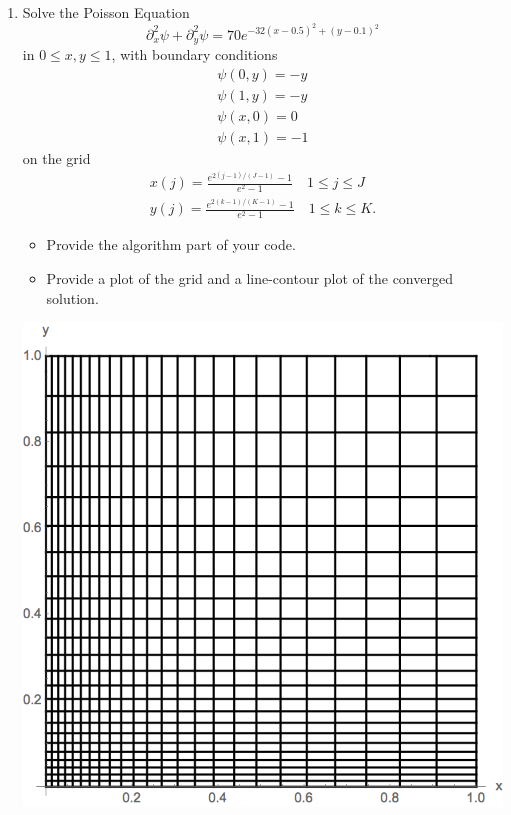 \documentclass[11pt, oneside]{article}
\begin{document}
\begin{enumerate}
  \item %
    Solve the Poisson Equation
    \[
      \partial_x^2\psi + \partial^2_y\psi = 70e^{-32(x - 0.5)^2 + (y - 0.1)^2}
    \]
    in $0 \le x, y \le 1$, with boundary conditions
    \begin{gather*}
      \psi(0, y) = -y \\
      \psi(1, y) = -y \\
      \psi(x, 0) = 0 \\
      \psi(x, 1) = -1
    \end{gather*}
    on the grid
    \begin{gather*}
      x(j) = \frac{e^{2(j-1)/(J-1)} - 1}{e^2 - 1} \quad 1 \le j \le J \\
      y(j) = \frac{e^{2(k-1)/(K-1)} - 1}{e^2 - 1} \quad 1 \le k \le K.
    \end{gather*}
    \begin{itemize}
      \item Provide the algorithm part of your code.
      \item Provide a plot of the grid and a line-contour plot of the converged solution.
    \end{itemize}

    \begin{center}
      \includegraphics[scale=0.5]{Figures/05_06.png}
    \end{center}


\end{enumerate}
\end{document}
